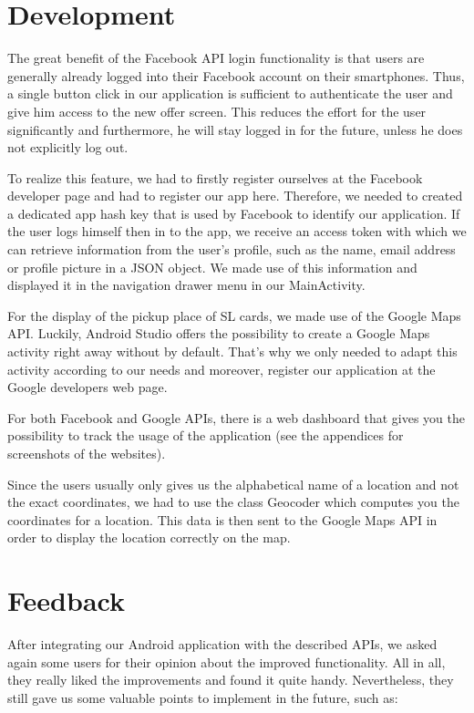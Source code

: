 \documentclass[11pt,twoside,a4paper]{report}
\begin{document}
\section{Development}

The great benefit of the Facebook API login functionality is that users are generally already logged into their Facebook account on their smartphones. Thus, a single button click in our application is sufficient to authenticate the user and give him access to the new offer screen. This reduces the effort for the user significantly and furthermore, he will stay logged in for the future, unless he does not explicitly log out.

To realize this feature, we had to firstly register ourselves at the Facebook developer page and had to register our app here. Therefore, we needed to created a dedicated app hash key that is used by Facebook to identify our application. If the user logs himself then in to the app, we receive an access token with which we can retrieve information from the user's profile, such as the name, email address or profile picture in a JSON object. We made use of this information and displayed it in the navigation drawer menu in our MainActivity. 

For the display of the pickup place of SL cards, we made use of the Google Maps API. Luckily, Android Studio offers the possibility to create a Google Maps activity right away without by default. That's why we only needed to adapt this activity according to our needs and moreover, register our application at the Google developers web page. 

For both Facebook and Google APIs, there is a web dashboard that gives you the possibility to track the usage of the application (see the appendices for screenshots of the websites).

Since the users usually only gives us the alphabetical name of a location and not the exact coordinates, we had to use the class Geocoder which computes you the coordinates for a location. This data is then sent to the Google Maps API in order to display the location correctly on the map.

\section{Feedback}

After integrating our Android application with the described APIs, we asked again some users for their opinion about the improved functionality. All in all, they really liked the improvements and found it quite handy. Nevertheless, they still gave us some valuable points to implement in the future, such as:
\end{document}
